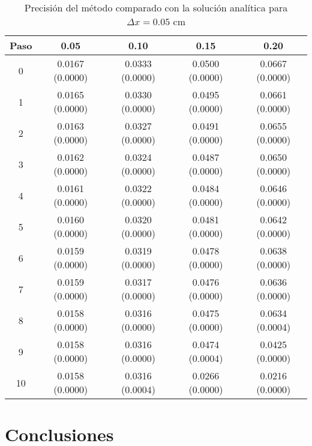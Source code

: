\documentclass[11pt]{article}
\begin{document}
\begin{table}
\center
\begin{tabular}{ c c c c c }
\hline
Paso & 0.05 & 0.10 & 0.15 & 0.20 \\
\hline
\hline
0 & 0.0167 (0.0000) & 0.0333 (0.0000) & 0.0500 (0.0000) & 0.0667 (0.0000) \\
1 & 0.0165 (0.0000) & 0.0330 (0.0000) & 0.0495 (0.0000) & 0.0661 (0.0000) \\
2 & 0.0163 (0.0000) & 0.0327 (0.0000) & 0.0491 (0.0000) & 0.0655 (0.0000) \\
3 & 0.0162 (0.0000) & 0.0324 (0.0000) & 0.0487 (0.0000) & 0.0650 (0.0000) \\
4 & 0.0161 (0.0000) & 0.0322 (0.0000) & 0.0484 (0.0000) & 0.0646 (0.0000) \\
5 & 0.0160 (0.0000) & 0.0320 (0.0000) & 0.0481 (0.0000) & 0.0642 (0.0000) \\
6 & 0.0159 (0.0000) & 0.0319 (0.0000) & 0.0478 (0.0000) & 0.0638 (0.0000) \\
7 & 0.0159 (0.0000) & 0.0317 (0.0000) & 0.0476 (0.0000) & 0.0636 (0.0000) \\
8 & 0.0158 (0.0000) & 0.0316 (0.0000) & 0.0475 (0.0000) & 0.0634 (0.0004) \\
9 & 0.0158 (0.0000) & 0.0316 (0.0000) & 0.0474 (0.0004) & 0.0425 (0.0000) \\
10 & 0.0158 (0.0000) & 0.0316 (0.0004) & 0.0266 (0.0000) & 0.0216 (0.0000) \\
\end{tabular}

\caption{Precisión del método comparado con la solución analítica para $\Delta{x} = 0.05$ cm}
\label{tab:comparativa3}
\end{table}

\section{Conclusiones}
\end{document}
